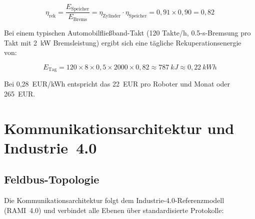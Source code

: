 ﻿\documentclass[a4paper,12pt]{scrreprt}
\theoremstyle{definition}
\begin{document}
\begin{equation}
  \eta_{\text{rek}} = \frac{E_{\text{Speicher}}}{E_{\text{Brems}}}
  = \eta_{\text{Zylinder}} \cdot \eta_{\text{Speicher}}
  = 0{,}91 \times 0{,}90 = 0{,}82
\end{equation}

Bei einem typischen Automobilfließband-Takt (120 Takte/h, 0.5-s-Bremsung
pro Takt mit \SI{2}{\kilo\watt} Bremsleistung) ergibt sich eine
tägliche Rekuperationsenergie von:

\begin{equation}
  E_{\text{Tag}} = 120 \times 8 \times 0{,}5 \times 2000 \times 0{,}82
  \approx 787~kJ \approx 0{,}22~kWh
\end{equation}

Bei 0{,}28~EUR/kWh entspricht das
22~EUR pro Roboter und Monat oder 265~EUR.

\section{Kommunikationsarchitektur und Industrie~4.0}

\subsection{Feldbus-Topologie}

Die Kommunikationsarchitektur folgt dem Industrie-4.0-Referenzmodell
(RAMI~4.0) und verbindet alle Ebenen über standardisierte Protokolle:
\end{document}

